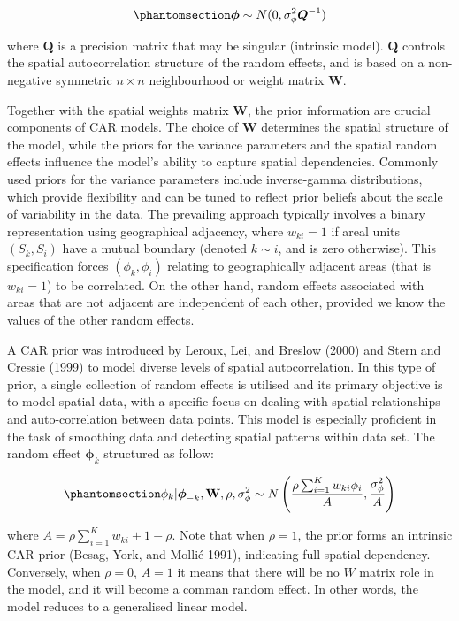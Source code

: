 \documentclass[
  default,
]{sn-jnl}
\begin{document}
\begin{equation}\phantomsection\label{eq-phidist}{
\boldsymbol{\phi}\sim N(0,\sigma_{\phi}^2\boldsymbol{Q}^{-1}) 
}\end{equation}

where \(\boldsymbol{Q}\) is a precision matrix that may be singular
(intrinsic model). \(\boldsymbol{Q}\) controls the spatial
autocorrelation structure of the random effects, and is based on a
non-negative symmetric \(n \times n\) neighbourhood or weight matrix
\(\boldsymbol{W}\).

Together with the spatial weights matrix \(\boldsymbol{W}\), the prior
information are crucial components of CAR models. The choice of
\(\boldsymbol{W}\) determines the spatial structure of the model, while
the priors for the variance parameters and the spatial random effects
influence the model's ability to capture spatial dependencies. Commonly
used priors for the variance parameters include inverse-gamma
distributions, which provide flexibility and can be tuned to reflect
prior beliefs about the scale of variability in the data. The prevailing
approach typically involves a binary representation using geographical
adjacency, where \(w_{ki} = 1\) if areal units \((S_k,S_i)\) have a
mutual boundary (denoted \(k\sim i\), and is zero otherwise). This
specification forces \((\phi_k,\phi_i)\) relating to geographically
adjacent areas (that is \(w_{ki} = 1\)) to be correlated. On the other
hand, random effects associated with areas that are not adjacent are
independent of each other, provided we know the values of the other
random effects.

A CAR prior was introduced by Leroux, Lei, and Breslow (2000) and Stern
and Cressie (1999) to model diverse levels of spatial autocorrelation.
In this type of prior, a single collection of random effects is utilised
and its primary objective is to model spatial data, with a specific
focus on dealing with spatial relationships and auto-correlation between
data points. This model is especially proficient in the task of
smoothing data and detecting spatial patterns within data set. The
random effect \(\boldsymbol\phi_k\) structured as follow:

\begin{equation}\phantomsection\label{eq-phicar}{
\phi_k|\boldsymbol{\phi}_{-k}, \mathbf{W},\rho, \sigma_{\phi}^2  \sim  N\left(\frac{\rho\sum_{i=1}^Kw_{ki}\phi_i}{A},\frac{\sigma_{\phi}^2}{A}\right)
}\end{equation}

where \(A = \rho\sum_{i=1}^Kw_{ki}+1-\rho\). Note that when
\(\rho = 1\), the prior forms an intrinsic CAR prior (Besag, York, and
Mollié 1991), indicating full spatial dependency. Conversely, when
\(\rho = 0\), \(A = 1\) it means that there will be no \(W\) matrix role
in the model, and it will become a comman random effect. In other words,
the model reduces to a generalised linear model.
\end{document}
